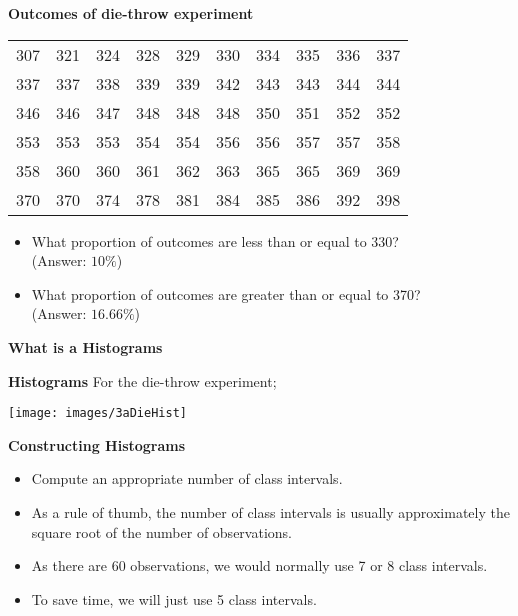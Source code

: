 \documentclass[]{report}
\begin{document}
{
\textbf{Outcomes of die-throw experiment}
\small
\begin{center}
\begin{tabular}{|c c c c c c c c c c|}
\hline
307 & 321 & 324 & 328 & 329 & 330 & 334 & 335 & 336 &337 \\
337 & 337 & 338 & 339 & 339 & 342 & 343 & 343 & 344 &344 \\
346 & 346 & 347 & 348 & 348 & 348 & 350 & 351 & 352 &352 \\
353 & 353 & 353 & 354 & 354 & 356 & 356 & 357 & 357 &358 \\
358 & 360 & 360 & 361 & 362 & 363 & 365 & 365 & 369 &369 \\
370 & 370 & 374 & 378 & 381 & 384 & 385 & 386 & 392 &398 \\
\hline
\end{tabular}
\end{center}
\normalsize
\begin{itemize}
\item  What proportion of outcomes are less than or equal to 330? \\ (Answer: $10\%$)
\item  What proportion of outcomes are greater than or equal to 370?\\ (Answer: $16.66\%$)
\end{itemize}
}

{
\textbf{What is a Histograms}



}

{
\textbf{Histograms}
For the die-throw experiment;
\begin{center}
\texttt{[image: images/3aDieHist]}
\end{center}

}
{
\textbf{Constructing Histograms}
\begin{itemize}
\item  Compute an appropriate number of class intervals.
\item  As a rule of thumb, the number of class intervals is usually approximately the square root of the number of observations.
\item  As there are 60 observations, we would normally use 7 or 8 class intervals.
\item  To save time, we will just use 5 class intervals.
\end{itemize}

}
\end{document}
